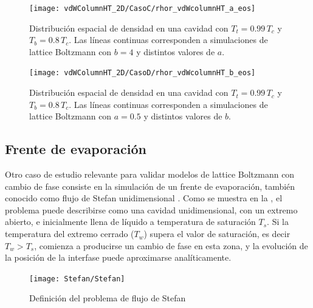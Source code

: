\begin{figure}[ht]
	\centering
	\texttt{[image: vdWColumnHT\_2D/CasoC/rhor\_vdWcolumnHT\_a\_eos]}
	\caption{Distribuci\'on espacial de densidad en una cavidad con $T_t = 0.99 \, T_c$ y $T_b = 0.8 \, T_c$. Las l\'ineas continuas corresponden a simulaciones de lattice Boltzmann con $b=4$ y distintos valores de $a$.}
	\label{fig:vdWColumnHT_rhor_a_eos}
\end{figure}

\begin{figure}[ht]
	\centering
	\texttt{[image: vdWColumnHT\_2D/CasoD/rhor\_vdWcolumnHT\_b\_eos]}
	\caption{Distribuci\'on espacial de densidad en una cavidad con $T_t = 0.99 \, T_c$ y $T_b = 0.8 \, T_c$. Las l\'ineas continuas corresponden a simulaciones de lattice Boltzmann con $a=0.5$ y distintos valores de $b$.}
	\label{fig:vdWColumnHT_rhor_b_eos}
\end{figure}
\FloatBarrier



\subsection{Frente de evaporaci\'on}

Otro caso de estudio relevante para validar modelos de lattice Boltzmann con cambio de fase consiste en la simulaci\'on de un frente de evaporaci\'on, tambi\'en conocido como flujo de Stefan unidimensional \cite{alexiades_mathematical_1993}. Como se muestra en la , el problema puede describirse como una cavidad unidimensional, con un extremo abierto, e inicialmente llena de l\'iquido a temperatura de saturaci\'on $T_s$. Si la temperatura del extremo cerrado ($T_w$) supera el valor de saturaci\'on, es decir $T_w > T_s$, comienza a producirse un cambio de fase en esta zona, y la evoluci\'on de la posici\'on de la interfase puede aproximarse anal\'iticamente. 

\begin{figure}[ht]
	\centering
	\texttt{[image: Stefan/Stefan]}
	\caption{Definici\'on del problema de flujo de Stefan}
	\label{fig:Stefan_cavity}
\end{figure}

